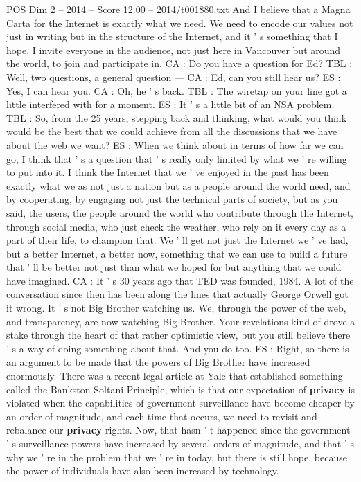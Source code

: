 \begin{textsample}{POS Dim 2 – 2014 – Score 12.00 – 2014/t001880.txt}
And I believe that a Magna Carta for the Internet is exactly what we need.
We need to encode our values not just in writing but in the structure of the Internet, and it ' s something that I hope, I invite everyone in the audience, not just here in Vancouver but around the world, to join and participate in.
CA : Do you have a question for Ed?
TBL : Well, two questions, a general question — CA : Ed, can you still hear us?
ES : Yes, I can hear you.
CA : Oh, he ' s back.
TBL : The wiretap on your line got a little interfered with for a moment.
ES : It ' s a little bit of an NSA problem.
TBL : So, from the 25 years, stepping back and thinking, what would you think would be the best that we could achieve from all the discussions that we have about the web we want?
ES : When we think about in terms of how far we can go, I think that ' s a question that ' s really only limited by what we ' re willing to put into it.
I think the Internet that we ' ve enjoyed in the past has been exactly what we as not just a nation but as a people around the world need, and by cooperating, by engaging not just the technical parts of society, but as you said, the users, the people around the world who contribute through the Internet, through social media, who just check the weather, who rely on it every day as a part of their life, to champion that.
We ' ll get not just the Internet we ' ve had, but a better Internet, a better now, something that we can use to build a future that ' ll be better not just than what we hoped for but anything that we could have imagined.
CA : It ' s 30 years ago that TED was founded, 1984.
A lot of the conversation since then has been along the lines that actually George Orwell got it wrong.
It ' s not Big Brother watching us.
We, through the power of the web, and transparency, are now watching Big Brother.
Your revelations kind of drove a stake through the heart of that rather optimistic view, but you still believe there ' s a way of doing something about that.
And you do too.
ES : Right, so there is an argument to be made that the powers of Big Brother have increased enormously.
There was a recent legal article at Yale that established something called the Bankston-Soltani Principle, which is that our expectation of \textbf{privacy} is violated when the capabilities of government surveillance have become cheaper by an order of magnitude, and each time that occurs, we need to revisit and rebalance our \textbf{privacy} rights.
Now, that hasn ' t happened since the government ' s surveillance powers have increased by several orders of magnitude, and that ' s why we ' re in the problem that we ' re in today, but there is still hope, because the power of individuals have also been increased by technology.

\end{textsample}
